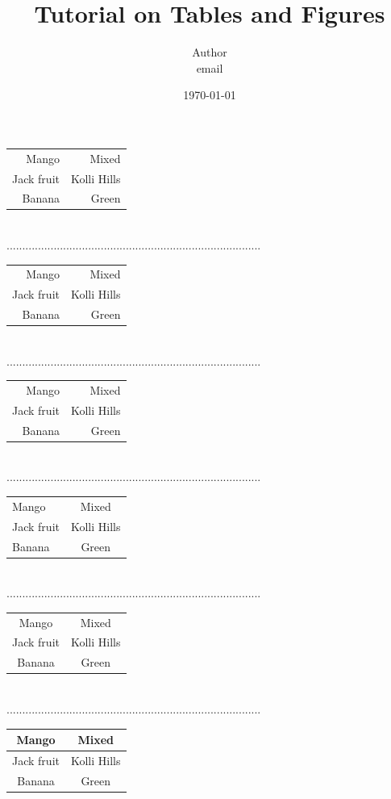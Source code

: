 \documentclass[12pt,a4paper]{article}
\title{Tutorial on Tables and Figures}
\author{Author \\ email \\ \byncsa} %
\date{\today}
\begin{document}
\maketitle
\newpage
\listoftables
\listoffigures
\newpage

\begin{tabular}{rr} %
Mango & Mixed \\
Jack fruit & Kolli Hills \\ 
Banana & Green
\end{tabular}
\\.................................................................................\\
\begin{tabular}{|r|r|} %
Mango & Mixed \\
Jack fruit & Kolli Hills \\ 
Banana & Green
\end{tabular}
\\.................................................................................\\
\begin{tabular}{||r|r|}
Mango & Mixed \\
Jack fruit & Kolli Hills \\ 
Banana & Green
\end{tabular}
\\.................................................................................\\
\begin{tabular}{||l|c|} %
Mango & Mixed \\
Jack fruit & Kolli Hills \\ 
Banana & Green
\end{tabular}
\\.................................................................................\\
\begin{tabular}{|c|c|}\hline %
Mango & Mixed \\ 
Jack fruit & Kolli Hills \\ 
Banana & Green \\ 
\end{tabular}
\\.................................................................................\\
\begin{tabular}{|c|c|}\hline 
Mango & Mixed \\ \hline
Jack fruit & Kolli Hills \\ \hline
Banana & Green \\ \hline
\end{tabular}
\end{document}
